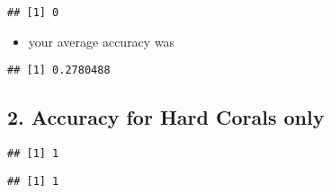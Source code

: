 \documentclass[]{article}
\newenvironment{Shaded}{\begin{snugshade}}{\end{snugshade}}
\newcommand{\KeywordTok}[1]{\textcolor[rgb]{0.13,0.29,0.53}{\textbf{#1}}}
\newcommand{\DataTypeTok}[1]{\textcolor[rgb]{0.13,0.29,0.53}{#1}}
\newcommand{\StringTok}[1]{\textcolor[rgb]{0.31,0.60,0.02}{#1}}
\newcommand{\OperatorTok}[1]{\textcolor[rgb]{0.81,0.36,0.00}{\textbf{#1}}}
\newcommand{\NormalTok}[1]{#1}
\providecommand{\tightlist}{%
  \setlength{\itemsep}{0pt}\setlength{\parskip}{0pt}}
\begin{document}
\begin{verbatim}
## [1] 0
\end{verbatim}

\begin{itemize}
\tightlist
\item
  your average accuracy was
\end{itemize}

\begin{Shaded}
\end{Shaded}

\begin{verbatim}
## [1] 0.2780488
\end{verbatim}

\subsection{2. Accuracy for Hard Corals
only}\label{accuracy-for-hard-corals-only}

\begin{Shaded}
\end{Shaded}

\begin{verbatim}
## [1] 1
\end{verbatim}

\begin{Shaded}
\end{Shaded}

\begin{verbatim}
## [1] 1
\end{verbatim}
\end{document}
